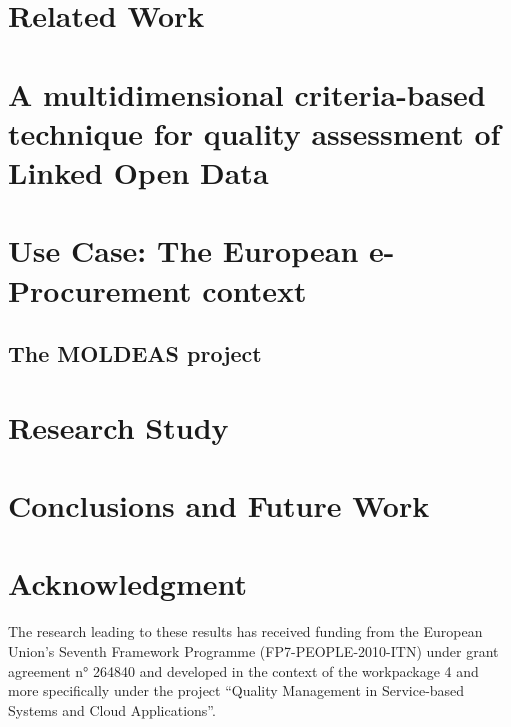 \documentclass[conference]{IEEEtran}
\begin{document}
\section{Related Work}


\section{A multidimensional criteria-based technique for quality assessment of Linked Open Data}
% 
% 
\section{Use Case: The European e-Procurement context}
\subsection{The MOLDEAS project}
%

\section{Research Study}


\section{Conclusions and Future Work}


\section*{Acknowledgment}
The research leading to these results has received funding from the European Union’s Seventh Framework Programme (FP7-PEOPLE-2010-ITN) 
under grant agreement n° 264840 and developed in the context of the workpackage 4 and more specifically under the project 
``Quality Management in Service-based Systems and Cloud Applications''.

\nocite{*}



\clearpage
{}

\end{document}
